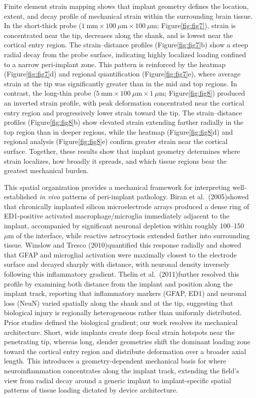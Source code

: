\documentclass[fleqn,10pt]{wlscirep}
\begin{document}
Finite element strain mapping shows that implant geometry defines the location, extent, and decay profile of mechanical strain within the surrounding brain tissue. In the short-thick probe ($1~\mathrm{mm}\times100~\mu\mathrm{m}\times100~\mu\mathrm{m}$; Figure\ref{fig:fig7}), strain is concentrated near the tip, decreases along the shank, and is lowest near the cortical entry region. The strain--distance profiles (Figure\ref{fig:fig7}b) show a steep radial decay from the probe surface, indicating highly localized loading confined to a narrow peri-implant zone. This pattern is reinforced by the heatmap (Figure\ref{fig:fig7}d) and regional quantification (Figure\ref{fig:fig7}e), where average strain at the tip was significantly greater than in the mid and top regions. In contrast, the long-thin probe ($5~\mathrm{mm}\times100~\mu\mathrm{m}\times1~\mu\mathrm{m}$; Figure\ref{fig:fig8}) produced an inverted strain profile, with peak deformation concentrated near the cortical entry region and progressively lower strain toward the tip. The strain--distance profiles (Figure\ref{fig:fig8}b) show elevated strain extending farther radially in the top region than in deeper regions, while the heatmap (Figure\ref{fig:fig8}d) and regional analysis (Figure\ref{fig:fig8}e) confirm greater strain near the cortical surface. Together, these results show that implant geometry determines where strain localizes, how broadly it spreads, and which tissue regions bear the greatest mechanical burden.

This spatial organization provides a mechanical framework for interpreting well-established \textit{in vivo} patterns of peri-implant pathology. Biran et al.\ (2005)\cite{Biran2005}showed that chronically implanted silicon microelectrode arrays produced a dense ring of ED1-positive activated macrophage/microglia immediately adjacent to the implant, accompanied by significant neuronal depletion within roughly 100--150~$\mu\mathrm{m}$ of the interface, while reactive astrocytosis extended farther into surrounding tissue. Winslow and Tresco (2010)\cite{Winslow2010}quantified this response radially and showed that GFAP and microglial activation were maximally closest to the electrode surface and decayed sharply with distance, with neuronal density inversely following this inflammatory gradient. Thelin et al.\ (2011)\cite{Thelin2011}further resolved this profile by examining both distance from the implant and position along the implant track, reporting that inflammatory markers (GFAP, ED1) and neuronal loss (NeuN) varied spatially along the shank and at the tip, suggesting that biological injury is regionally heterogeneous rather than uniformly distributed. Prior studies defined the biological gradient; our work resolves its mechanical architecture. Short, wide implants create deep focal strain hotspots near the penetrating tip, whereas long, slender geometries shift the dominant loading zone toward the cortical entry region and distribute deformation over a broader axial length. This introduces a geometry-dependent mechanical basis for where neuroinflammation concentrates along the implant track, extending the field's view from radial decay around a generic implant to implant-specific spatial patterns of tissue loading dictated by device architecture.
\end{document}
